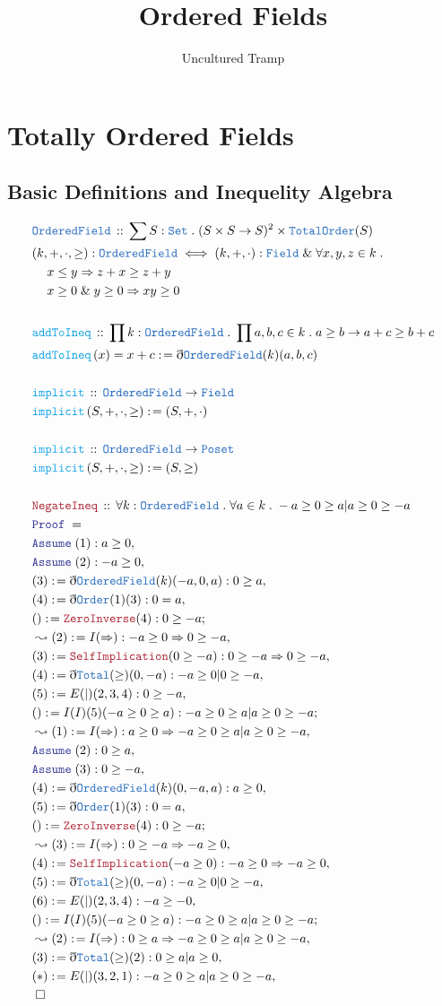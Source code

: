 \documentclass[12pt]{scrartcl}
\author{Uncultured Tramp}
\title{Ordered Fields}
\newcommand{\TYPE}[1]{\textcolor{NavyBlue}{\mathtt{#1}}}
\newcommand{\FUNC}[1]{\textcolor{Cerulean}{\mathtt{#1}}}
\newcommand{\LOGIC}[1]{\textcolor{Blue}{\mathtt{#1}}}
\newcommand{\THM}[1]{\textcolor{Maroon}{\mathtt{#1}}}
\renewcommand{\.}{\; . \;}
\newcommand{\de}{: \kern 0.1pc =}
\newcommand{\Act}[1]{\left( #1 \right)}
\newcommand{\Theorem}[2]{& \THM{#1} \, :: \, #2 \\ & \Proof = \\ }
\newcommand{\DeclareType}[2]{& \TYPE{#1} \, :: \, #2 \\}
\newcommand{\DefineType}[3]{& #1 : \TYPE{#2} \iff #3 \\}
\newcommand{\DeclareFunc}[2]{& \FUNC{#1} \, :: \, #2 \\}
\newcommand{\DefineFunc}[3]{&  \FUNC{#1}\Act{#2} \de #3 \\}
\newcommand{\DefineNamedFunc}[4]{&  \FUNC{#1}\Act{#2} = #3 \de #4 \\}
\newcommand{\NewLine}{\\ & \kern 1pc}
\newcommand{\Page}[1]{ \begin{align*} #1 \end{align*}   }
\newcommand{ \bd }{ \ByDef }
\renewcommand{\And}{\; \& \;}
\newcommand{\Set}{\TYPE{Set}}
\newcommand{\Say}[3]{& #1 \de #2 : #3, \\}
\newcommand{\Conclude}[3]{& #1 \de #2 : #3; \\}
\newcommand{\Derive}[3]{& \leadsto #1 \de #2 : #3, \\}
\newcommand{\A}{\LOGIC{Assume} \;}
\newcommand{\Assume}[2]{& \A #1 : #2, \\}
\newcommand{\QED}{\; \square}
\newcommand{\EndProof}{& \QED \\}
\newcommand{\ByDef}{\eth}
\newcommand{\Proof}{\LOGIC{Proof} \; }
\newcommand{\OF}{\TYPE{OrderedField}}
\begin{document}
\maketitle
\newpage
\tableofcontents
\newpage
\section{Totally Ordered Fields}
\subsection{Basic Definitions and Inequelity Algebra}
\Page{
\DeclareType{OrderedField}{  \sum S : \Set \. (S \times S \to S)^2 \times \TYPE{TotalOrder}(S)  }
\DefineType{(k,+,\cdot,\ge)}{OrderedField}{ (k,+,\cdot) : \TYPE{Field}  \And \forall x,y,z \in k \.  \NewLine
 x \le y \Rightarrow z + x \ge z + y \NewLine
 x \ge 0 \And y \ge 0 \Rightarrow  xy \ge 0  
}
\\
\DeclareFunc{addToIneq}{\prod k : \OF \. \prod a,b,c \in k \. a \ge b \to a + c \ge b + c }
\DefineNamedFunc{addToIneq}{ x }{x + c}{\bd \OF(k)(a,b,c)}
\\
\DeclareFunc{implicit}{\OF \to \TYPE{Field}}
\DefineFunc{implicit}{S,+,\cdot,\ge}{(S,+,\cdot)}
\\
\DeclareFunc{implicit}{\OF \to \TYPE{Poset}}
\DefineFunc{implicit}{S,+,\cdot,\ge}{(S,\ge)}
\\
\Theorem{NegateIneq}{ \forall k : \OF \. \forall a \in k \. -a \ge 0 \ge a | a \ge 0 \ge -a  }
\Assume{(1)}{ a \ge 0}
\Assume{(2)}{-a \ge 0}
\Say{(3)}{\bd \OF(k)( -a, 0 ,a)}{  0 \ge a   }
\Say{(4)}{\bd  \TYPE{Order}(1)(3)}{ 0 = a  }
\Conclude{()}{\THM{ZeroInverse}(4)}{0 \ge - a}
\Derive{(2)}{I(\Rightarrow)}{-a \ge 0 \Rightarrow 0 \ge -a }
\Say{(3)}{ \THM{SelfImplication}( 0 \ge -a )}{ 0 \ge -a \Rightarrow 0 \ge -a}
\Say{(4)}{ \bd \TYPE{Total}(\ge)(0, -a)}{ -a \ge 0 | 0 \ge -a }
\Say{(5)}{  E(|)(2,3,4)  }{ 0 \ge - a}
\Conclude{()}{I(I)(5)( -a \ge 0 \ge  a )}{ -a \ge 0 \ge a | a \ge 0 \ge -a    }
\Derive{(1)}{  I(\Rightarrow)  }{ a \ge 0 \Rightarrow -a \ge 0 \ge a | a \ge 0 \ge -a}
\Assume{(2)}{ 0 \ge a}
\Assume{(3)}{ 0 \ge -a}
\Say{(4)}{\bd \OF(k)( 0, -a , a)}{  a \ge 0   }
\Say{(5)}{\bd  \TYPE{Order}(1)(3)}{ 0 = a  }
\Conclude{()}{\THM{ZeroInverse}(4)}{0 \ge - a}
\Derive{(3)}{I(\Rightarrow)}{ 0 \ge -a \Rightarrow  -a \ge 0 }
\Say{(4)}{ \THM{SelfImplication}( -a \ge 0 )}{ -a \ge 0 \Rightarrow -a \ge 0}
\Say{(5)}{ \bd \TYPE{Total}(\ge)(0, -a)}{ -a \ge 0 | 0 \ge -a }
\Say{(6)}{  E(|)(2,3,4)  }{ -a \ge - 0 }
\Conclude{()}{I(I)(5)( -a \ge 0 \ge  a )}{ -a \ge 0 \ge a | a \ge 0 \ge -a    }
\Derive{(2)}{  I(\Rightarrow)  }{ 0 \ge a \Rightarrow -a \ge 0 \ge a | a \ge 0 \ge -a}
\Say{(3)}{ \bd \TYPE{Total}(\ge)(2) }{ 0 \ge a | a \ge 0   }
\Say{(*)}{ E(|)(3,2,1) }{ - a \ge  0 \ge a | a \ge 0 \ge -a}
\EndProof
}
\end{document}
